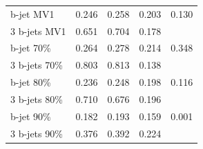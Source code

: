 \begin{table}[h]
\begin{center}
{\begin{tabular}{l|cccc }
            b-jet MV1     & 0.246 & 0.258 & 0.203 & 0.130 \\        
            3 b-jets MV1  & 0.651 & 0.704 & 0.178 &       \\\hline  
                                                                    
            b-jet  70\%   & 0.264 & 0.278 & 0.214 &  0.348 \\        
            3 b-jets 70\% & 0.803 & 0.813 & 0.138 &       \\\hline  
                                                                    
            b-jet 80\%    & 0.236 & 0.248 & 0.198 & 0.116 \\        
            3 b-jets 80\% & 0.710 & 0.676 & 0.196 &       \\\hline  
                                                                    
            b-jet 90\%    & 0.182 & 0.193 & 0.159 & 0.001 \\        
            3 b-jets 90\% & 0.376 & 0.392 & 0.224 &       \\\hline  
\end{tabular}
}
\end{center}
\end{table}

